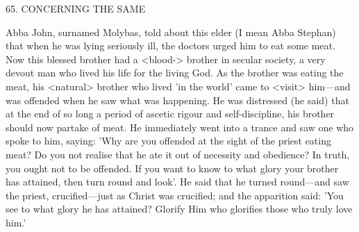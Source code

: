 65. CONCERNING THE SAME

Abba John, surnamed Molybas, told about this elder (I mean Abba
Stephan) that when he was lying seriously ill, the doctors urged him
to eat some meat. Now this blessed brother had a <blood-> brother
in secular society, a very devout man who lived his life for the living
God. As the brother was eating the meat, his <natural> brother
who lived 'in the world' came to <visit> him—and was offended
when he saw what was happening. He was distressed (he said) that
at the end of so long a period of ascetic rigour and self-discipline,
his brother should now partake of meat. He immediately went into
a trance and saw one who spoke to him, saying: 'Why are you
offended at the sight of the priest eating meat? Do you not realise
that he ate it out of necessity and obedience? In truth, you ought
not to be offended. If you want to know to what glory your brother
has attained, then turn round and look'. He said that he turned
round—and saw the priest, crucified—just as Christ was crucified;
and the apparition said: 'You see to what glory he has attained?
Glorify Him who glorifies those who truly love him.'

